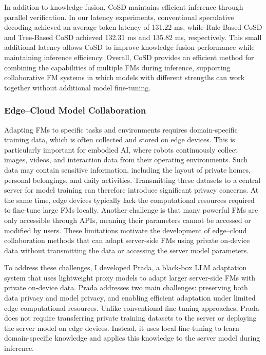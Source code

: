 \documentclass[11pt]{article}
\begin{document}
In addition to knowledge fusion, CoSD maintains efficient inference through parallel verification. In our latency experiments, conventional speculative decoding achieved an average token latency of 131.22 ms, while Rule-Based CoSD and Tree-Based CoSD achieved 132.31 ms and 135.82 ms, respectively. This small additional latency allows CoSD to improve knowledge fusion performance while maintaining inference efficiency. Overall, CoSD provides an efficient method for combining the capabilities of multiple FMs during inference, supporting collaborative FM systems in which models with different strengths can work together without additional model fine-tuning.

\subsubsection{Edge--Cloud Model Collaboration}
\label{subsubsec:prada}

Adapting FMs to specific tasks and environments requires domain-specific training data, which is often collected and stored on edge devices. This is particularly important for embodied AI, where robots continuously collect images, videos, and interaction data from their operating environments. Such data may contain sensitive information, including the layout of private homes, personal belongings, and daily activities. Transmitting these datasets to a central server for model training can therefore introduce significant privacy concerns. At the same time, edge devices typically lack the computational resources required to fine-tune large FMs locally. Another challenge is that many powerful FMs are only accessible through APIs, meaning their parameters cannot be accessed or modified by users. These limitations motivate the development of edge--cloud collaboration methods that can adapt server-side FMs using private on-device data without transmitting the data or accessing the server model parameters.

To address these challenges, I developed Prada, a black-box LLM adaptation system that uses lightweight proxy models to adapt larger server-side FMs with private on-device data. Prada addresses two main challenges: preserving both data privacy and model privacy, and enabling efficient adaptation under limited edge computational resources. Unlike conventional fine-tuning approaches, Prada does not require transferring private training datasets to the server or deploying the server model on edge devices. Instead, it uses local fine-tuning to learn domain-specific knowledge and applies this knowledge to the server model during inference.
\end{document}
